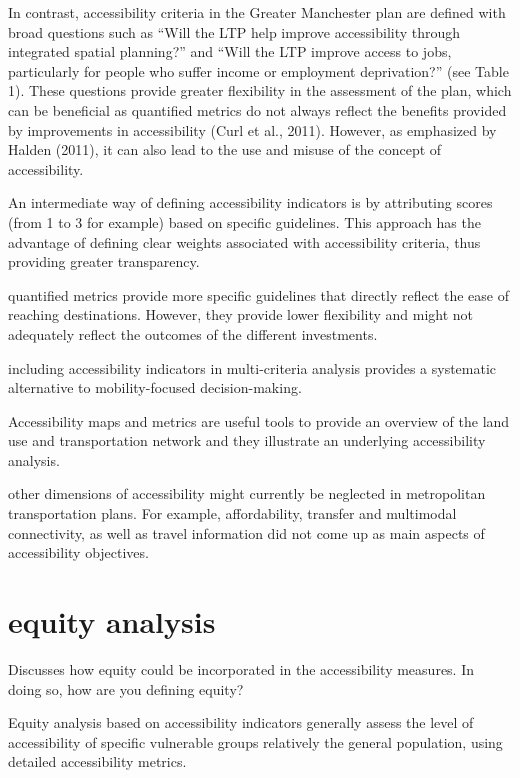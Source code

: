 \documentclass[12pt,]{article}
\begin{document}
In contrast, accessibility criteria in the Greater Manchester plan are
defined with broad questions such as ``Will the LTP help improve
accessibility through integrated spatial planning?'' and ``Will the LTP
improve access to jobs, particularly for people who suffer income or
employment deprivation?'' (see Table 1). These questions provide greater
flexibility in the assessment of the plan, which can be beneficial as
quantified metrics do not always reflect the benefits provided by
improvements in accessibility (Curl et al., 2011). However, as
emphasized by Halden (2011), it can also lead to the use and misuse of
the concept of accessibility.

An intermediate way of defining accessibility indicators is by
attributing scores (from 1 to 3 for example) based on specific
guidelines. This approach has the advantage of defining clear weights
associated with accessibility criteria, thus providing greater
transparency.

quantified metrics provide more specific guidelines that directly
reflect the ease of reaching destinations. However, they provide lower
flexibility and might not adequately reflect the outcomes of the
different investments.

including accessibility indicators in multi-criteria analysis provides a
systematic alternative to mobility-focused decision-making.

Accessibility maps and metrics are useful tools to provide an overview
of the land use and transportation network and they illustrate an
underlying accessibility analysis.

other dimensions of accessibility might currently be neglected in
metropolitan transportation plans. For example, affordability, transfer
and multimodal connectivity, as well as travel information did not come
up as main aspects of accessibility objectives.

\hypertarget{equity-analysis}{%
\section{equity analysis}\label{equity-analysis}}

Discusses how equity could be incorporated in the accessibility
measures. In doing so, how are you defining equity?

Equity analysis based on accessibility indicators generally assess the
level of accessibility of specific vulnerable groups relatively the
general population, using detailed accessibility metrics.
\end{document}
